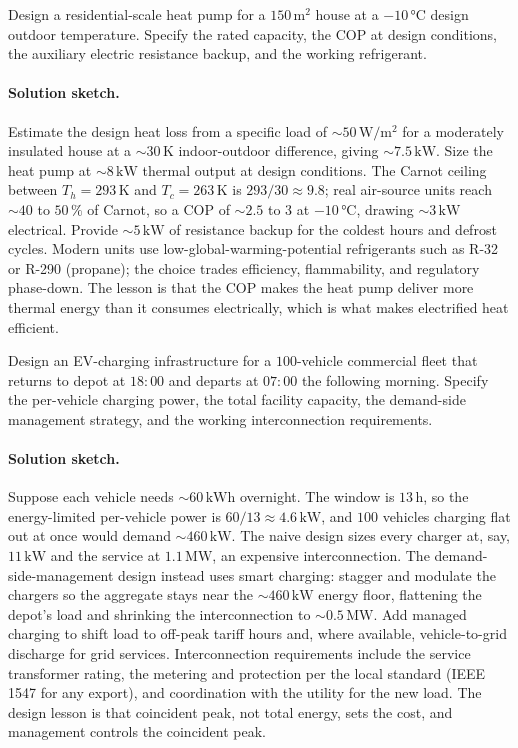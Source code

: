\begin{exercise}
Design a residential-scale heat pump for a $150\,\si{\meter\squared}$
house at a $-10\,\si{\celsius}$ design outdoor temperature. Specify
the rated capacity, the COP at design conditions, the auxiliary
electric resistance backup, and the working refrigerant.
\paragraph{Solution sketch.}
Estimate the design heat loss from a specific load of $\sim 50\,\si{
\watt\per\meter\squared}$ for a moderately insulated house at a
$\sim 30\,\si{\kelvin}$ indoor-outdoor difference, giving $\sim 7.5\,\si{
\kilo\watt}$. Size the heat pump at $\sim 8\,\si{\kilo\watt}$ thermal
output at design conditions. The Carnot ceiling between $T_h = 293\,\si{
\kelvin}$ and $T_c = 263\,\si{\kelvin}$ is $293/30 \approx 9.8$; real
air-source units reach $\sim 40$ to $50\,\%$ of Carnot, so a COP of
$\sim 2.5$ to $3$ at $-10\,\si{\celsius}$, drawing $\sim 3\,\si{\kilo
\watt}$ electrical. Provide $\sim 5\,\si{\kilo\watt}$ of resistance
backup for the coldest hours and defrost cycles. Modern units use
low-global-warming-potential refrigerants such as R-32 or R-290
(propane); the choice trades efficiency, flammability, and regulatory
phase-down. The lesson is that the COP makes the heat pump deliver more
thermal energy than it consumes electrically, which is what makes
electrified heat efficient.
\end{exercise}

\begin{exercise}
Design an EV-charging infrastructure for a $100$-vehicle commercial
fleet that returns to depot at $18{:}00$ and departs at $07{:}00$
the following morning. Specify the per-vehicle charging power, the
total facility capacity, the demand-side management strategy, and the
working interconnection requirements.
\paragraph{Solution sketch.}
Suppose each vehicle needs $\sim 60\,\si{\kilo\watt\hour}$ overnight. The
window is $13\,\si{\hour}$, so the energy-limited per-vehicle power is
$60/13 \approx 4.6\,\si{\kilo\watt}$, and $100$ vehicles charging flat
out at once would demand $\sim 460\,\si{\kilo\watt}$. The naive design
sizes every charger at, say, $11\,\si{\kilo\watt}$ and the service at
$1.1\,\si{\mega\watt}$, an expensive interconnection. The
demand-side-management design instead uses smart charging: stagger and
modulate the chargers so the aggregate stays near the $\sim 460\,\si{
\kilo\watt}$ energy floor, flattening the depot's load and shrinking the
interconnection to $\sim 0.5\,\si{\mega\watt}$. Add managed charging to
shift load to off-peak tariff hours and, where available,
vehicle-to-grid discharge for grid services. Interconnection
requirements include the service transformer rating, the metering and
protection per the local standard (IEEE 1547 for any export), and
coordination with the utility for the new load. The design lesson is
that coincident peak, not total energy, sets the cost, and management
controls the coincident peak.
\end{exercise}

